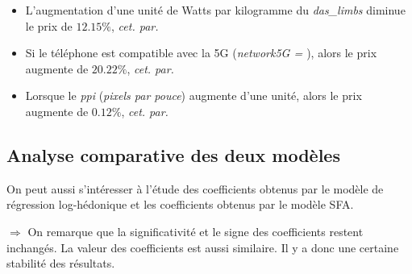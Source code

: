 \documentclass[
  12pt,
]{report}
\providecommand{\tightlist}{%
  \setlength{\itemsep}{0pt}\setlength{\parskip}{0pt}}\usepackage{longtable,booktabs,array}
\renewcommand{\texttt}[1]{\colorbox{light}{\color{highlight}{\ttfamily{#1}}}}
\begin{document}
\begin{itemize}
  \begin{itemize}
  \tightlist
  \item
    L'augmentation d'une unité de Watts par kilogramme du
    \emph{das\_limbs} diminue le prix de \(12.15\%\), \emph{cet. par.}
  \end{itemize}
\end{itemize}

\begin{itemize}
\item
  Si le téléphone est compatible avec la 5G (\emph{network5G =
  \texttt{TRUE}}), alors le prix augmente de \(20.22\%\), \emph{cet.
  par.}
\item
  Lorsque le \emph{ppi} (\emph{pixels par pouce}) augmente d'une unité,
  alors le prix augmente de \(0.12\%\), \emph{cet. par.}
\end{itemize}

\subsection{Analyse comparative des deux
modèles}\label{analyse-comparative-des-deux-moduxe8les}

On peut aussi s'intéresser à l'étude des coefficients obtenus par le
modèle de régression log-hédonique et les coefficients obtenus par le
modèle SFA.

\(\Rightarrow\) On remarque que la significativité et le signe des
coefficients restent inchangés. La valeur des coefficients est aussi
similaire. Il y a donc une certaine stabilité des résultats.
\end{document}
